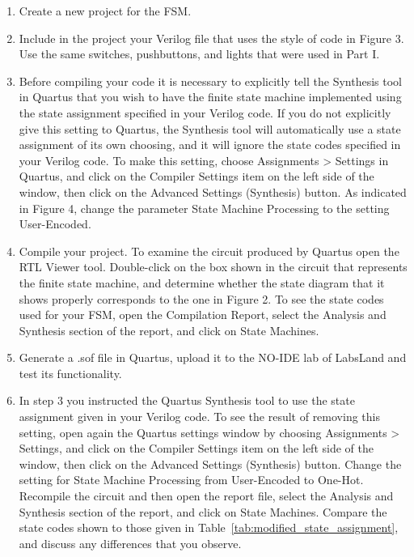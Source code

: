\documentclass[epsfig,10pt,fullpage]{article}
\begin{document}
\begin{enumerate}
\item Create a new project for the FSM.

\item Include in the project your Verilog file that uses the style of code in Figure 3.
Use the same switches, pushbuttons, and lights that were used in Part I.

\item Before compiling your code it is necessary to explicitly tell the Synthesis tool in
Quartus that you wish to have the finite state machine implemented using the state
assignment specified in your Verilog code. If you do not explicitly give this
setting to Quartus, the Synthesis tool will automatically use a state assignment of
its own choosing, and it will ignore the state codes specified in your Verilog code. To
make this setting, choose {\sf Assignments > Settings} in Quartus, and click on the
{\sf Compiler Settings} item on the left side of the window, then click on 
the {\sf Advanced Settings (Synthesis)} button.  As indicated in Figure 4, change the 
parameter {\sf State Machine Processing} to the setting {\sf User-Encoded}.

\item Compile your project. To examine the circuit produced by Quartus open 
the RTL Viewer tool. Double-click
on the box shown in the circuit that represents the finite state machine, and determine
whether the state diagram that it shows properly corresponds to the one in Figure 2.
To see the state codes used for your FSM, open the Compilation Report, select the {\sf Analysis
and Synthesis} section of the report, and click on {\sf State Machines}.

\item Generate a .sof file in Quartus, upload it to the NO-IDE lab of LabsLand and test its functionality.

\item In step 3 you instructed the Quartus Synthesis tool to use the state
assignment given in your Verilog code. To see the result of removing this setting, open
again the Quartus settings window by choosing {\sf Assignments > Settings}, and 
click on the {\sf Compiler Settings} item on the left side of the window, then click on 
the {\sf Advanced Settings (Synthesis)} button. Change the setting for  
{\sf State Machine Processing} from {\sf User-Encoded} to {\sf One-Hot}. Recompile the
circuit and then open the report file, select the {\sf Analysis
and Synthesis} section of the report, and click on {\sf State Machines}.
Compare the state codes shown to those given in Table~\ref{tab:modified_state_assignment}, and
discuss any differences that you observe.

\end{enumerate}
\end{document}
